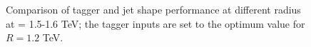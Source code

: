 \begin{figure}
\begin{center}
\caption{Comparison of tagger and jet shape performance at different radius at \pt = 1.5-1.6 TeV; the tagger inputs are set to the optimum value for $R=1.2$ TeV.}
\label{fig:Rcomparison_top_optOnce}
\end{center}
\end{figure}

